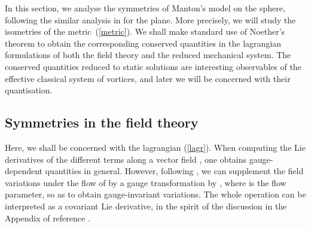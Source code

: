 \documentclass[a4paper,11pt]{article}
\begin{document}
In this section, we analyse the symmetries of Manton's model on the 
sphere, following the similar analysis in \cite{MNcl} for the plane. More 
precisely, we will study the isometries of the 
metric~(\ref{metric}).
We shall make standard use of Noether's theorem to obtain the 
corresponding 
conserved quantities in the lagrangian formulations of both the field 
theory and the
reduced mechanical system. The conserved quantities reduced to static
solutions are interesting observables of the effective classical system of
vortices, and later we will be concerned with their quantisation.


\subsection {Symmetries in the field theory}


Here, we shall be concerned with the lagrangian (\ref{lagr}).
When computing the Lie derivatives of the different terms along a
vector field \myHighlight{$\xi$}\coordHE{}, one obtains gauge-dependent quantities in
general. However, following \cite{MNcl},
we can supplement the 
field variations under the flow of \myHighlight{$\xi$}\coordHE{} by a gauge transformation by
\coordHE{}, where \myHighlight{$\alpha$}\coordHE{} is the flow parameter, so as 
to obtain gauge-invariant variations.
The whole operation can be interpreted as a covariant Lie derivative,
in the spirit of the discussion in the Appendix of reference \cite{Sturr}.
\end{document}

